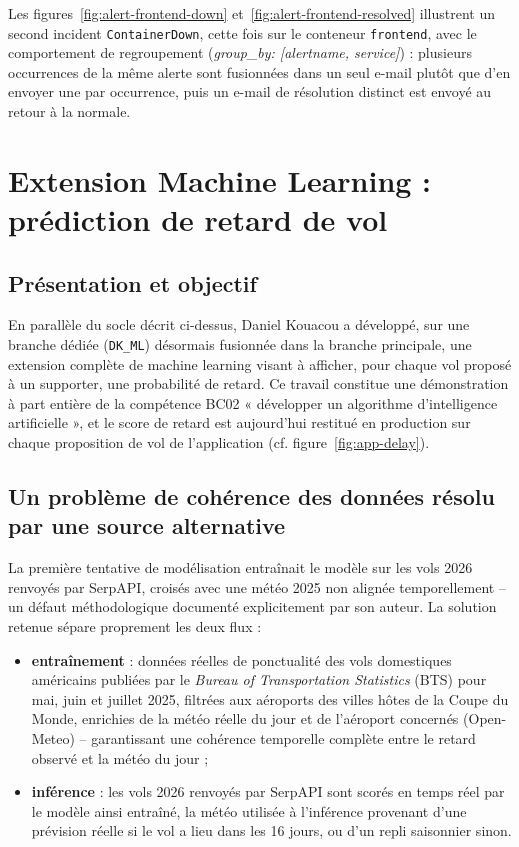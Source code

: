 \documentclass[11pt,a4paper]{report}
\newcommand{\code}[1]{\lstinline{#1}}
\begin{document}
Les figures~\ref{fig:alert-frontend-down} et~\ref{fig:alert-frontend-resolved} illustrent un second incident \code{ContainerDown}, cette fois sur le conteneur \code{frontend}, avec le comportement de regroupement (\emph{group\_by: [alertname, service]}) : plusieurs occurrences de la même alerte sont fusionnées dans un seul e-mail plutôt que d'en envoyer une par occurrence, puis un e-mail de résolution distinct est envoyé au retour à la normale.

\section{Extension Machine Learning : prédiction de retard de vol}
\label{sec:ml}

\subsection{Présentation et objectif}

En parallèle du socle décrit ci-dessus, Daniel Kouacou a développé, sur une branche dédiée (\code{DK_ML}) désormais fusionnée dans la branche principale, une extension complète de machine learning visant à afficher, pour chaque vol proposé à un supporter, une probabilité de retard. Ce travail constitue une démonstration à part entière de la compétence BC02 « développer un algorithme d'intelligence artificielle », et le score de retard est aujourd'hui restitué en production sur chaque proposition de vol de l'application (cf. figure~\ref{fig:app-delay}).

\subsection{Un problème de cohérence des données résolu par une source alternative}

La première tentative de modélisation entraînait le modèle sur les vols 2026 renvoyés par SerpAPI, croisés avec une météo 2025 non alignée temporellement -- un défaut méthodologique documenté explicitement par son auteur. La solution retenue sépare proprement les deux flux :

\begin{itemize}
  \item \textbf{entraînement} : données réelles de ponctualité des vols domestiques américains publiées par le \emph{Bureau of Transportation Statistics} (BTS) pour mai, juin et juillet 2025, filtrées aux aéroports des villes hôtes de la Coupe du Monde, enrichies de la météo réelle du jour et de l'aéroport concernés (Open-Meteo) -- garantissant une cohérence temporelle complète entre le retard observé et la météo du jour ;
  \item \textbf{inférence} : les vols 2026 renvoyés par SerpAPI sont scorés en temps réel par le modèle ainsi entraîné, la météo utilisée à l'inférence provenant d'une prévision réelle si le vol a lieu dans les 16 jours, ou d'un repli saisonnier sinon.
\end{itemize}
\end{document}
